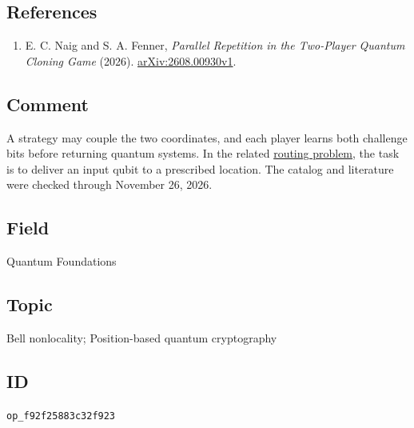 \subsection*{References}

\begin{enumerate}[label={},leftmargin=4.8em,labelsep=0.5em]
  \footnotesize
  \item[\textup{[NF26]}]\label{ref:cloning}
  E. C. Naig and S. A. Fenner, \emph{Parallel Repetition in the Two-Player Quantum Cloning Game} (2026). \href{https://arxiv.org/abs/2608.00930v1}{arXiv:2608.00930v1}.
\end{enumerate}

\subsection*{Comment}

A strategy may couple the two coordinates, and each player learns both challenge bits before returning quantum systems. In the related \href{https://qiqc-op.com/problem/op_96cf7aa1c1be9be2/}{routing problem}, the task is to deliver an input qubit to a prescribed location. The catalog and literature were checked through November 26, 2026.

\subsection*{Field}

Quantum Foundations

\subsection*{Topic}

Bell nonlocality; Position-based quantum cryptography

\subsection*{ID}

\texttt{op\_f92f25883c32f923}
